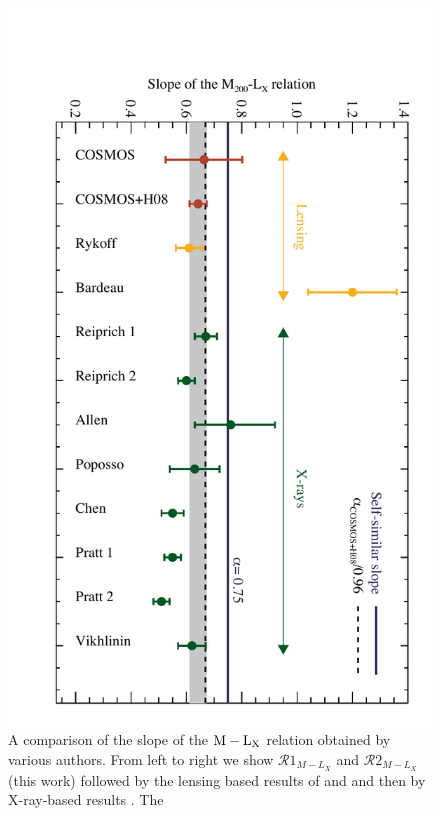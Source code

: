 \documentclass[12pt]{emulateapj}
\newcommand{\mlx}{$\rm{M} - \rm{L}_{\rm X}$ }
\begin{document}
\begin{figure}[htb]
\centerline{\includegraphics[angle=90,scale=0.57]{figure9.pdf}}
\caption{A comparison of the slope of the \mlx relation obtained by
  various authors. From left to right we show $\mathcal{R}1_{M-L_{X}}$
  and $\mathcal{R}2_{M-L_{X}}$ (this work) followed by the lensing
  based results of \protect\citet{Rykoff:2008} and
  \protect\citet{Bardeau:2007} and then by X-ray-based results
  \protect\citep[][]{Reiprich:2002,Allen:2003,Popesso:2005,Chen:2007,Pratt:2008,Vikhlinin:2009}. The
}
\end{figure}
\end{document}
